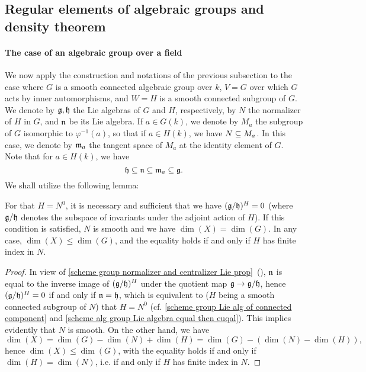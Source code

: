 \subsection{Regular elements of algebraic groups and density theorem}
\paragraph{The case of an algebraic group over a field}\label{scheme alg group regular element paragraph}
We now apply the construction and notations of the previous subsection to the case where $G$ is a smooth connected algebraic group over $k$, $V=G$ over which $G$ acts by inner automorphisms, and $W=H$ is a smooth connected subgroup of $G$. We denote by $\mathfrak{g},\mathfrak{h}$ the Lie algebras of $G$ and $H$, respectively, by $N$ the normalizer of $H$ in $G$, and $\mathfrak{n}$ be its Lie algebra. If $a\in G(k)$, we denote by $M_a$ the subgroup of $G$ isomorphic to $\varphi^{-1}(a)$, so that if $a\in H(k)$, we have $N\subseteq M_a$. In this case, we denote by $\mathfrak{m}_a$ the tangent space of $M_a$ at the identity element of $G$. Note that for $a\in H(k)$, we have
\[\mathfrak{h}\subseteq\mathfrak{n}\subseteq\mathfrak{m}_a\subseteq\mathfrak{g}.\]
We shall utilize the following lemma:

\begin{lemma}\label{scheme alg group smooth connected subgroup equal normalizer component iff}
For that $H=N^0$, it is necessary and sufficient that we have $(\mathfrak{g}/\mathfrak{h})^H=0$ (where $\mathfrak{g}/\mathfrak{h}$ denotes the subspace of invariants under the adjoint action of $H$). If this condition is satisfied, $N$ is smooth and we have $\dim(X)=\dim(G)$. In any case, $\dim(X)\leq\dim(G)$, and the equality holds if and only if $H$ has finite index in $N$.
\end{lemma}
\begin{proof}
In view of \cref{scheme group normalizer and centralizer Lie prop}~(), $\mathfrak{n}$ is equal to the inverse image of $(\mathfrak{g}/\mathfrak{h})^H$ under the quotient map $\mathfrak{g}\to\mathfrak{g}/\mathfrak{h}$, hence $(\mathfrak{g}/\mathfrak{h})^H=0$ if and only if $\mathfrak{n}=\mathfrak{h}$, which is equivalent to ($H$ being a smooth connected subgroup of $N$) that $H=N^0$ (cf. \cref{scheme group Lie alg of connected component} and \cref{scheme alg group Lie algebra equal then euqal}). This implies evidently that $N$ is smooth. On the other hand, we have
\[\dim(X)=\dim(G)-\dim(N)+\dim(H)=\dim(G)-(\dim(N)-\dim(H)),\]
hence $\dim(X)\leq\dim(G)$, with the equality holds if and only if $\dim(H)=\dim(N)$, i.e. if and only if $H$ has finite index in $N$. 
\end{proof}

